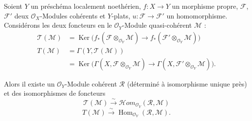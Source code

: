\begin{corollary}[7.7.7]
Soient $Y$ un préschéma localement noethérien, $f:X\to Y$ un morphisme propre,
$\mathscr F$, $\mathscr F'$ deux $\mathscr O_X$-Modules cohérents et $Y$-plats,
$u:\mathscr F\to\mathscr F'$ un homomorphisme. Considérons les deux foncteurs en
le $\mathscr O_Y$-Module quasi-cohérent $\mathscr M$ :
\begin{align*}
  \mathscr T(\mathscr M)
  &=
  \operatorname{Ker}
  \bigl(
    f_*(\mathscr F\otimes_{\mathscr O_Y}\mathscr M)
    \longrightarrow
    f_*(\mathscr F'\otimes_{\mathscr O_Y}\mathscr M)
  \bigr)\\
  T(\mathscr M)
  &=
  \Gamma(Y,\mathscr T(\mathscr M))\\
  &=
  \operatorname{Ker}
  \bigl(
    \Gamma(X,\mathscr F\otimes_{\mathscr O_Y}\mathscr M)
    \longrightarrow
    \Gamma(X,\mathscr F'\otimes_{\mathscr O_Y}\mathscr M)
  \bigr).
\end{align*}

Alors il existe un $\mathscr O_Y$-Module cohérent $\mathscr R$ (déterminé à
isomorphisme unique près) et des isomorphismes de foncteurs
\[
  \mathscr T(\mathscr M)
  \xrightarrow{\sim}
  \mathscr{H}\!om_{\mathscr O_Y}(\mathscr R,\mathscr M)
  \tag{7.7.7.1}\label{III.7.7.7.1.fr}
\]
\[
  T(\mathscr M)
  \xrightarrow{\sim}
  \operatorname{Hom}_{\mathscr O_Y}(\mathscr R,\mathscr M).
  \tag{7.7.7.2}\label{III.7.7.7.2.fr}
\]
\end{corollary}

